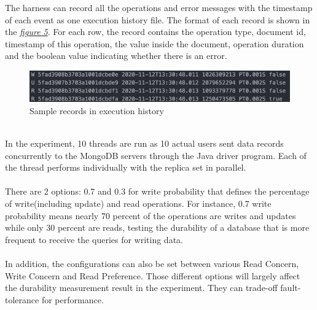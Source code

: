 \documentclass[12pt]{article}
\begin{document}
The harness can record all the operations and error messages with the timestamp of each event as one execution history file. The format of each record is shown in the \hyperref[fig:history]{\textit{figure 5}}. For each row, the record contains the operation type, document id, timestamp of this operation, the value inside the document, operation duration and the boolean value indicating whether there is an error.\\
\begin{figure}
  \centering
  \includegraphics[width=\textwidth]{img/history.png}
  \caption{Sample records in execution history}
  \label{fig:history}
\end{figure}
\\
In the experiment, 10 threads are run as 10 actual users sent data records concurrently to the MongoDB servers through the Java driver program. Each of the thread performs individually with the replica set in parallel.\\
\\
There are 2 options: 0.7 and 0.3 for write probability that defines the percentage of write(including update) and read operations. For instance, 0.7 write probability means nearly 70 percent of the operations are writes and updates while only 30 percent are reads, testing the durability of a database that is more frequent to receive the queries for writing data.\\
\\
In addition, the configurations can also be set between various Read Concern, Write Concern and Read Preference. Those different options will largely affect the durability measurement result in the experiment. They can trade-off fault-tolerance for performance.\\
\end{document}
